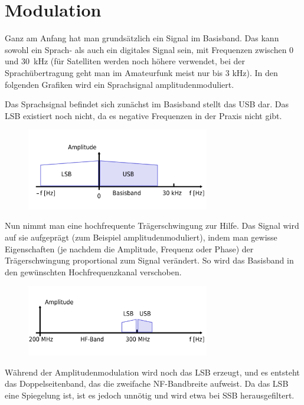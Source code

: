 \chapter{Modulation}
Ganz am Anfang hat man grundsätzlich ein Signal im Basisband. Das kann sowohl ein Sprach- als auch ein digitales Signal sein, mit Frequenzen zwischen 0 und 30 kHz (für Satelliten werden noch höhere verwendet, bei der Sprachübertragung geht man im Amateurfunk meist nur bis 3 kHz). In den folgenden Grafiken wird ein Sprachsignal amplitudenmoduliert.

Das Sprachsignal befindet sich zunächst im Basisband stellt das USB dar. Das LSB existiert noch nicht, da es negative Frequenzen in der Praxis nicht gibt.

\begin{figure}[h<!]
 \centering
 \includegraphics[width=8cm]{./png/Amfu-Modulation-Basisband.png}
 \label{fig:basisband}
\end{figure}


Nun nimmt man eine hochfrequente Trägerschwingung zur Hilfe. Das Signal wird auf sie aufgeprägt (zum Beispiel amplitudenmoduliert), indem man gewisse Eigenschaften (je nachdem die Amplitude, Frequenz oder Phase) der Trägerschwingung proportional zum Signal verändert. So wird das Basisband in den gewünschten Hochfrequenzkanal verschoben.

\begin{figure}[h!]
 \centering
 \includegraphics[width=8cm]{./png/Amfu-Modulation-HF.png}
 \label{fig:hfband}
\end{figure}


Während der Amplitudenmodulation wird noch das LSB erzeugt, und es entsteht das Doppelseitenband, das die zweifache NF-Bandbreite aufweist. Da das LSB eine Spiegelung ist, ist es jedoch unnötig und wird etwa bei SSB herausgefiltert.

